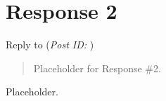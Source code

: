 \documentclass[12pt]{article}
\theoremstyle{definition}
\theoremstyle{plain}
\begin{document}
    \section{Response 2}
      \begin{mdframed}
        Reply to \textbf{} (\textit{Post ID: }) 
      \end{mdframed}
      \begin{quote}
        Placeholder for Response \#2.
      \end{quote}
      Placeholder.

  \newpage
  \nocite{textbook}
  \printbibliography[
    heading=bibintoc,
    title={Works Cited}
  ]
\end{document}

